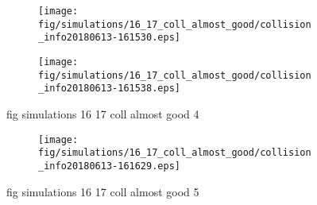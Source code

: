 \begin{figure}[H]
	\centering
	\begin{subfigure}[b]{0.8\textwidth}
		\texttt{[image: fig/simulations/16\_17\_coll\_almost\_good/collision\_info20180613-161530.eps]}
		\caption{}
		\label{fig:simulations:16_17_coll_almost_good:collision_info20180613-161530}
	\end{subfigure}

	\begin{subfigure}[b]{0.8\textwidth}
		\texttt{[image: fig/simulations/16\_17\_coll\_almost\_good/collision\_info20180613-161538.eps]}
		\caption{}
		\label{fig:simulations:16_17_coll_almost_good:collision_info20180613-161538}
	\end{subfigure}
	\caption{fig simulations 16 17 coll almost good 4}
	\label{fig:simulations:16_17_coll_almost_good:4}
\end{figure}

\begin{figure}[H]
	\centering
	\begin{subfigure}[b]{0.8\textwidth}
		\texttt{[image: fig/simulations/16\_17\_coll\_almost\_good/collision\_info20180613-161629.eps]}
		\caption{}
		\label{fig:simulations:16_17_coll_almost_good:collision_info20180613-161629}
	\end{subfigure}
	\caption{fig simulations 16 17 coll almost good 5}
	\label{fig:simulations:16_17_coll_almost_good:5}
\end{figure}

